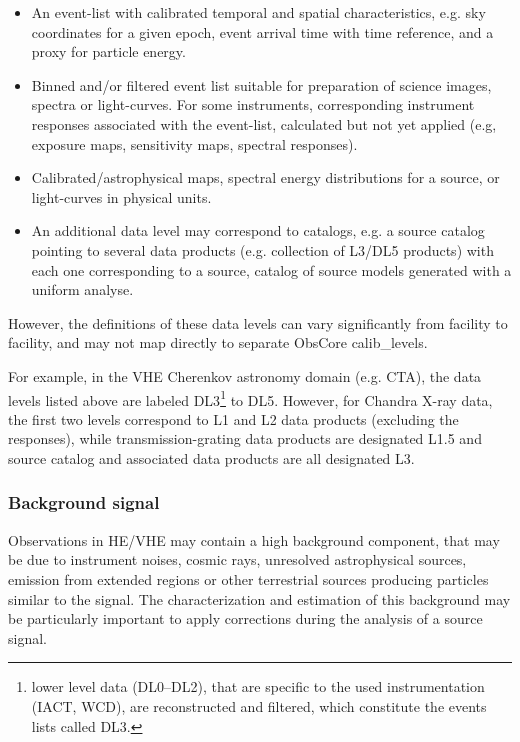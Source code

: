 \documentclass[11pt,a4paper]{ivoa}
\begin{document}
\begin{itemize}
    \item[1] An event-list with calibrated temporal and spatial characteristics, e.g. sky coordinates for a given epoch,
    event arrival time with time reference, and a proxy for particle energy.
    \item[2] Binned and/or filtered event list suitable for preparation of science images, spectra or light-curves. For
    some instruments, corresponding instrument responses associated with the event-list, calculated but not yet applied
    (e.g, exposure maps, sensitivity maps, spectral responses).
    \item[3] Calibrated/astrophysical maps, spectral energy distributions for a source, or light-curves in physical units.
    \item[4] An additional data level may correspond to catalogs, e.g. a source catalog pointing to several data products
    (e.g. collection of L3/DL5 products) with each one corresponding to a source, catalog of source models generated with
    a uniform analyse.
\end{itemize}

However, the definitions of these data levels can vary significantly from facility to facility, and may not map directly
to separate ObsCore calib\_levels.

For example, in the VHE Cherenkov astronomy domain (e.g. CTA), the data levels listed above are labeled DL3\footnote{lower
level data (DL0--DL2), that are specific to the used instrumentation (IACT, WCD), are reconstructed and filtered, which
constitute the events lists called DL3.} to DL5.  However, for Chandra X-ray data, the first two levels correspond to L1
and L2 data products (excluding the responses), while transmission-grating data products are designated L1.5 and source
catalog and associated data products are all designated L3.

\subsubsection{Background signal}

Observations in HE/VHE may contain a high background component, that may be due to instrument noises, cosmic rays,
unresolved astrophysical sources, emission from extended regions or other terrestrial sources producing particles similar
to the signal. The characterization and estimation of this background may be particularly important to apply corrections
during the analysis of a source signal.
\end{document}
